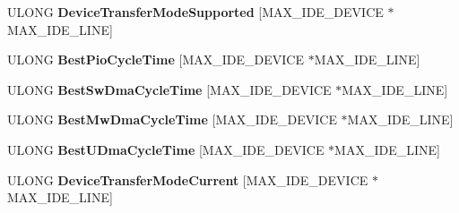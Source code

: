 \begin{DoxyCompactItemize}
\item 
\mbox{\label{struct___p_c_i_i_d_e___t_r_a_n_s_f_e_r___m_o_d_e___s_e_l_e_c_t_a06efe1e5c3448b084dc1d7ece9b0ff55}} 
U\+L\+O\+NG {\bfseries Device\+Transfer\+Mode\+Supported} \mbox{[}M\+A\+X\+\_\+\+I\+D\+E\+\_\+\+D\+E\+V\+I\+CE $\ast$M\+A\+X\+\_\+\+I\+D\+E\+\_\+\+L\+I\+NE\mbox{]}
\item 
\mbox{\label{struct___p_c_i_i_d_e___t_r_a_n_s_f_e_r___m_o_d_e___s_e_l_e_c_t_a14c1a4dd7efd7549f775175d25c3b730}} 
U\+L\+O\+NG {\bfseries Best\+Pio\+Cycle\+Time} \mbox{[}M\+A\+X\+\_\+\+I\+D\+E\+\_\+\+D\+E\+V\+I\+CE $\ast$M\+A\+X\+\_\+\+I\+D\+E\+\_\+\+L\+I\+NE\mbox{]}
\item 
\mbox{\label{struct___p_c_i_i_d_e___t_r_a_n_s_f_e_r___m_o_d_e___s_e_l_e_c_t_a3a4e35a58aa86a8d49b1833a40934841}} 
U\+L\+O\+NG {\bfseries Best\+Sw\+Dma\+Cycle\+Time} \mbox{[}M\+A\+X\+\_\+\+I\+D\+E\+\_\+\+D\+E\+V\+I\+CE $\ast$M\+A\+X\+\_\+\+I\+D\+E\+\_\+\+L\+I\+NE\mbox{]}
\item 
\mbox{\label{struct___p_c_i_i_d_e___t_r_a_n_s_f_e_r___m_o_d_e___s_e_l_e_c_t_a30d89584d5a5dfbf24095e0b2ddebd0b}} 
U\+L\+O\+NG {\bfseries Best\+Mw\+Dma\+Cycle\+Time} \mbox{[}M\+A\+X\+\_\+\+I\+D\+E\+\_\+\+D\+E\+V\+I\+CE $\ast$M\+A\+X\+\_\+\+I\+D\+E\+\_\+\+L\+I\+NE\mbox{]}
\item 
\mbox{\label{struct___p_c_i_i_d_e___t_r_a_n_s_f_e_r___m_o_d_e___s_e_l_e_c_t_a8308eafa0365580effff6012cd2a4561}} 
U\+L\+O\+NG {\bfseries Best\+U\+Dma\+Cycle\+Time} \mbox{[}M\+A\+X\+\_\+\+I\+D\+E\+\_\+\+D\+E\+V\+I\+CE $\ast$M\+A\+X\+\_\+\+I\+D\+E\+\_\+\+L\+I\+NE\mbox{]}
\item 
\mbox{\label{struct___p_c_i_i_d_e___t_r_a_n_s_f_e_r___m_o_d_e___s_e_l_e_c_t_a19ba48280c80c765196fb74fe403a45d}} 
U\+L\+O\+NG {\bfseries Device\+Transfer\+Mode\+Current} \mbox{[}M\+A\+X\+\_\+\+I\+D\+E\+\_\+\+D\+E\+V\+I\+CE $\ast$M\+A\+X\+\_\+\+I\+D\+E\+\_\+\+L\+I\+NE\mbox{]}
\item 

\end{DoxyCompactItemize}
